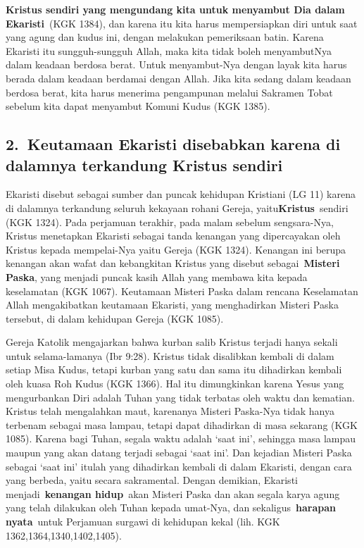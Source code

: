 \textbf{Kristus sendiri yang mengundang kita untuk menyambut Dia dalam
Ekaristi}~(KGK 1384), dan karena itu kita harus mempersiapkan diri
untuk saat yang agung dan kudus ini, dengan melakukan pemeriksaan
batin. Karena Ekaristi itu sungguh-sungguh Allah, maka kita tidak boleh
menyambutNya dalam keadaan berdosa berat. Untuk menyambut-Nya dengan
layak kita harus berada dalam keadaan berdamai dengan Allah. Jika kita
sedang dalam keadaan berdosa berat, kita harus menerima pengampunan
melalui Sakramen Tobat sebelum kita dapat menyambut Komuni Kudus (KGK
1385).

\subsection[2.~Keutamaan Ekaristi disebabkan karena di dalamnya
terkandung Kristus sendiri]{2.~\textbf{Keutamaan Ekaristi disebabkan
karena di dalamnya terkandung Kristus sendiri}}
Ekaristi disebut sebagai sumber dan puncak kehidupan Kristiani (LG 11)
karena di dalamnya terkandung seluruh kekayaan rohani Gereja,
yaitu\textbf{Kristus}~sendiri (KGK 1324). Pada perjamuan terakhir, pada
malam sebelum sengsara-Nya, Kristus menetapkan Ekaristi sebagai tanda
kenangan yang dipercayakan oleh Kristus kepada mempelai-Nya yaitu
Gereja (KGK 1324). Kenangan ini berupa kenangan akan wafat dan
kebangkitan Kristus yang disebut sebagai~\textbf{Misteri Paska}, yang
menjadi puncak kasih Allah yang membawa kita kepada keselamatan (KGK
1067). Keutamaan Misteri Paska dalam rencana Keselamatan Allah
mengakibatkan keutamaan Ekaristi, yang menghadirkan Misteri Paska
tersebut, di dalam kehidupan Gereja (KGK 1085).

Gereja Katolik mengajarkan bahwa kurban salib Kristus terjadi hanya
sekali untuk selama-lamanya (Ibr 9:28). Kristus tidak disalibkan
kembali di dalam setiap Misa Kudus, tetapi kurban yang satu dan sama
itu dihadirkan kembali oleh kuasa Roh Kudus (KGK 1366). Hal itu
dimungkinkan karena Yesus yang mengurbankan Diri adalah Tuhan yang
tidak terbatas oleh waktu dan kematian. Kristus telah mengalahkan maut,
karenanya Misteri Paska-Nya tidak hanya terbenam sebagai masa lampau,
tetapi dapat dihadirkan di masa sekarang (KGK 1085). Karena bagi Tuhan,
segala waktu adalah {\textquoteleft}saat ini{\textquoteright}, sehingga
masa lampau maupun yang akan datang terjadi sebagai
{\textquoteleft}saat ini{\textquoteright}. Dan kejadian Misteri Paska
sebagai {\textquoteleft}saat ini{\textquoteright} itulah yang
dihadirkan kembali di dalam Ekaristi, dengan cara yang berbeda, yaitu
secara sakramental. Dengan demikian, Ekaristi menjadi~\textbf{kenangan
hidup}~akan Misteri Paska dan akan segala karya agung yang telah
dilakukan oleh Tuhan kepada umat-Nya, dan sekaligus~\textbf{harapan
nyata}~untuk Perjamuan surgawi di kehidupan kekal (lih. KGK
1362,1364,1340,1402,1405).

